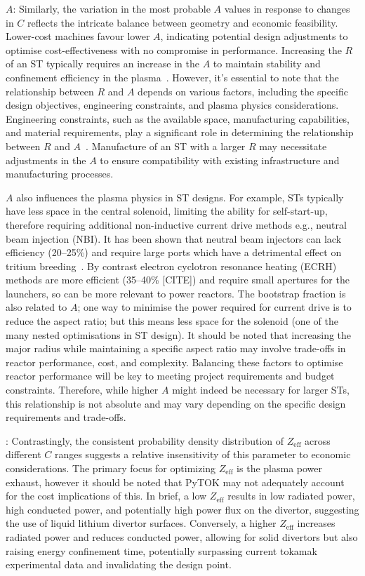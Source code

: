 \documentclass[journal]{IEEEtran}
\begin{document}
\textbf{$A$}: Similarly, the variation in the most probable $A$ values in response to changes in $C$ reflects the intricate balance between geometry and economic feasibility. Lower-cost machines favour lower $A$, indicating potential design adjustments to optimise cost-effectiveness with no compromise in performance. Increasing the $R$ of an ST typically requires an increase in the $A$ to maintain stability and confinement efficiency in the plasma~\cite{Costley2021}. However, it's essential to note that the relationship between $R$ and $A$ depends on various factors, including the specific design objectives, engineering constraints, and plasma physics considerations. Engineering constraints, such as the available space, manufacturing capabilities, and material requirements, play a significant role in determining the relationship between $R$ and $A$~\cite{Costley2021}. Manufacture of an ST with a larger $R$ may necessitate adjustments in the $A$ to ensure compatibility with existing infrastructure and manufacturing processes. 

$A$ also influences the plasma physics in ST designs. For example, STs typically have less space in the central solenoid, limiting the ability for self-start-up, therefore requiring additional non-inductive current drive methods e.g., neutral beam injection (NBI). It has been shown that neutral beam injectors can lack efficiency (20--25\%) and require large ports which have a detrimental effect on tritium breeding~\cite{Guebaly2017, Simonin2021}. By contrast electron cyclotron resonance heating (ECRH) methods are more efficient (35--40\% [CITE]) and require small apertures for the launchers, so can be more relevant to power reactors. The bootstrap fraction is also related to $A$; one way to minimise the power required for current drive is to reduce the aspect ratio; but this means less space for the solenoid (one of the many nested optimisations in ST design). It should be noted that increasing the major radius while maintaining a specific aspect ratio may involve trade-offs in reactor performance, cost, and complexity. Balancing these factors to optimise reactor performance will be key to meeting project requirements and budget constraints. Therefore, while higher $A$ might indeed be necessary for larger STs, this relationship is not absolute and may vary depending on the specific design requirements and trade-offs.

: Contrastingly, the consistent probability density distribution of $Z_{\text{eff}}$ across different $C$ ranges suggests a relative insensitivity of this parameter to economic considerations. The primary focus for optimizing $Z_{\text{eff}}$ is the plasma power exhaust, however it should be noted that PyTOK may not adequately account for the cost implications of this. In brief, a low $Z_{\text{eff}}$  results in low radiated power, high conducted power, and potentially high power flux on the divertor, suggesting the use of liquid lithium divertor surfaces. Conversely, a higher $Z_{\text{eff}}$ increases radiated power and reduces conducted power, allowing for solid divertors but also raising energy confinement time, potentially surpassing current tokamak experimental data and invalidating the design point. 
\end{document}
